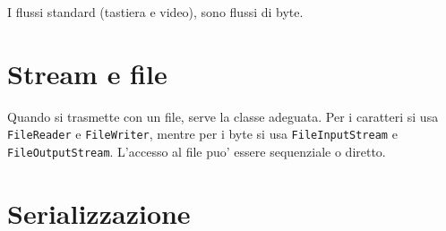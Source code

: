 I flussi standard (tastiera e video), sono flussi di byte.

\section{Stream e file}
Quando si trasmette con un file, serve la classe adeguata. Per i caratteri si usa \texttt{FileReader} e \texttt{FileWriter}, mentre per i byte si usa \texttt{FileInputStream} e \texttt{FileOutputStream}.
L'accesso al file puo' essere sequenziale o diretto.

\section{Serializzazione}

